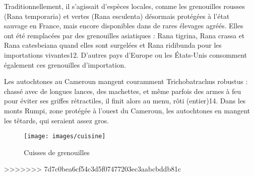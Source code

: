 \documentclass[10pt,a4paper]{article}
\begin{document}
Traditionnellement, il s'agissait d'espèces locales, comme les grenouilles rousses (Rana temporaria) et vertes (Rana esculenta) désormais protégées à l'état sauvage en France, mais encore disponibles dans de rares élevages agréés. Elles ont été remplacées par des grenouilles asiatiques : Rana tigrina, Rana crassa et Rana catesbeiana quand elles sont surgelées et Rana ridibunda pour les importations vivantes12. D'autres pays d'Europe ou les États-Unis consomment également ces grenouilles d'importation.

Les autochtones au Cameroun mangent couramment Trichobatrachus robustus : chassé avec de longues lances, des machettes, et même parfois des armes à feu pour éviter ses griffes rétractiles, il finit alors au menu, rôti (entier)14. Dans les monts Rumpi, zone protégée à l'ouest du Cameroun, les autochtones en mangent les têtards, qui seraient assez gros.

\begin{figure}
\begin{center}
\texttt{[image: images/cuisine]}
\end{center}
\caption{Cuisses de grenouilles}
\label{fig:gre}
\end{figure}
>>>>>>> 7d7c0bea6cf54c3d5f07477203ec3aabcbddb81c
				
\end{document}
